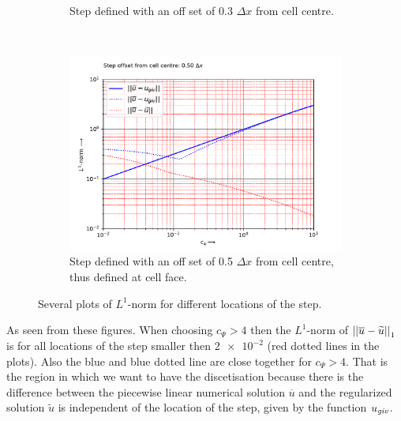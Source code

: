 \begin{figure}[H]
\begin{subfigure}{0.49\textwidth}
    \caption{Step defined with an off set of  0.3 $\Delta x$ from cell centre.\label{fig:L1_norm_dx_offset_0.3dx}}
\end{subfigure}
\\
\begin{subfigure}{0.49\textwidth}
    \includegraphics[width=\textwidth]{figures/regul_1d_step_at=0.5_dx50.0.pdf}
    \caption{Step defined with an off set of  0.5 $\Delta x$ from cell centre, thus defined at cell face.\label{fig:L1_norm_dx_offset_0.5dx}}
\end{subfigure}
\caption{Several plots of $L^1$-norm for different locations of the step.}
\end{figure}

As seen from these figures.
When choosing  $c_{\Psi} > 4$ then the $L^1$-norm of $\left| |\overline{u} - \widetilde{u}| \right|_{1}$ is for all locations of the step smaller then $\num{2e-2}$ (red dotted lines in the plots).
Also the blue and blue dotted line are close together for $c_{\Psi}>4$.
That is the region in which we want to have the discetisation because there is the difference between the piecewise linear numerical solution $\overline{u}$ and the regularized solution $\widetilde{u}$ is independent of the location of the step, given by the function $u_{\it{giv}}$.

